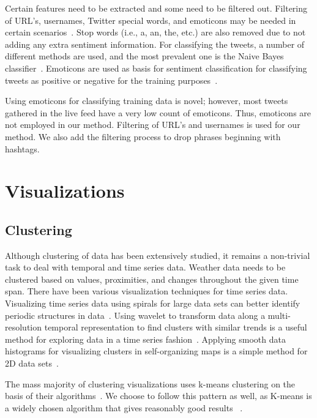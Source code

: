 Certain features need to be extracted and some need to be filtered out. Filtering of URL's, usernames, Twitter special words, and emoticons may be needed in certain scenarios~\cite{pak2010twitter}. Stop words (i.e., a, an, the, etc.) are also removed due to not adding any extra sentiment information. For classifying the tweets, a number of different methods are used, and the most prevalent one is the Naive Bayes classifier~\cite{pak2010twitter}. Emoticons are used as basis for sentiment classification for classifying tweets as positive or negative for the training purposes~\cite{keller2005warm,pak2010twitter}.

Using emoticons for classifying training data is novel; however, most tweets gathered in the live feed have a very low count of emoticons. Thus, emoticons are not employed in our method. Filtering of URL's and usernames is used for our method. We also add the filtering process to drop phrases beginning with hashtags.

\section{Visualizations}

\subsection{Clustering}

Although clustering of data has been extensively studied, it remains a non-trivial task to deal with temporal and time series data. Weather data needs to be clustered based on values, proximities, and changes throughout the given time span. There have been various visualization techniques for time series data. Visualizing time series data using spirals for large data sets can better identify periodic structures in data~\cite{pak2010twitter}. Using wavelet to transform data along a multi-resolution temporal representation to find clusters with similar trends is a useful method for exploring data in a time series fashion~\cite{woodring2009multiscale}. Applying smooth data histograms for visualizing clusters in self-organizing maps is a simple method for 2D data sets~\cite{pampalk2002using}.

The mass majority of clustering visualizations uses k-means clustering on the basis of their algorithms~\cite{li2014nasty,weber2001visualizing}. We choose to follow this pattern as well, as K-means is a widely chosen algorithm that gives reasonably good results ~\cite{weber2001visualizing,jain2010data}.

